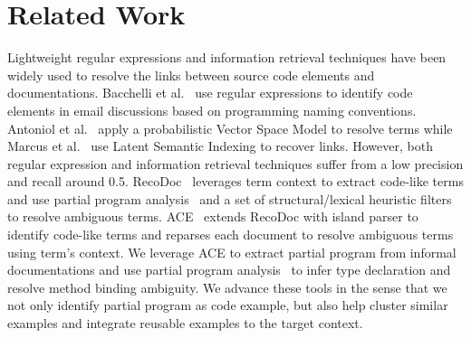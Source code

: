 
\section{Related Work}

  Lightweight regular expressions and information retrieval techniques have been widely used to resolve the links between source code elements and documentations. Bacchelli et al.~\cite{Bacchelli:emailICSE10} use regular expressions to  identify code elements in email discussions based on programming naming conventions. Antoniol et al.~\cite{Antoniol:Link02} apply a probabilistic Vector Space Model to resolve terms while Marcus et al.~\cite{Marcus:LinkICSE03} use Latent Semantic Indexing to recover links. However, both regular expression and information retrieval techniques suffer from a low precision and recall around 0.5. RecoDoc~\cite{RecoDoc:ICSE12} leverages term context to extract code-like terms and use partial program analysis~\cite{partialProgram:OOPSLA08} and a set of structural/lexical heuristic filters to resolve ambiguous terms. ACE~\cite{PeterACE:ICSE13} extends RecoDoc with island parser to identify code-like terms and reparses each document to resolve ambiguous terms using term's context. We leverage ACE to extract partial program from informal documentations and use partial program analysis~\cite{partialProgram:OOPSLA08}  to infer type declaration and resolve method binding ambiguity. We advance these tools in the sense that we not only identify partial program as code example, but also help cluster similar examples and integrate reusable examples to the target context. 

